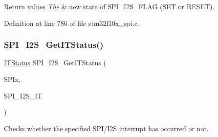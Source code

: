 \begin{DoxyRetVals}{Return values}
{\em The} & new state of S\+P\+I\+\_\+\+I2\+S\+\_\+\+F\+L\+AG (S\+ET or R\+E\+S\+ET). \\
\hline
\end{DoxyRetVals}


Definition at line 786 of file stm32f10x\+\_\+spi.\+c.

\mbox{\label{group___s_p_i___private___functions_ga72decbc1cd79f8fad92a2204beca6bc5}} 
\subsubsection{\texorpdfstring{S\+P\+I\+\_\+\+I2\+S\+\_\+\+Get\+I\+T\+Status()}{SPI\_I2S\_GetITStatus()}}
{\footnotesize\ttfamily \hyperlink{group___exported__types_gaacbd7ed539db0aacd973a0f6eca34074}{I\+T\+Status} S\+P\+I\+\_\+\+I2\+S\+\_\+\+Get\+I\+T\+Status (\begin{DoxyParamCaption}\item[{\hyperlink{struct_s_p_i___type_def}{S\+P\+I\+\_\+\+Type\+Def} $\ast$}]{S\+P\+Ix,  }\item[{uint8\+\_\+t}]{S\+P\+I\+\_\+\+I2\+S\+\_\+\+IT }\end{DoxyParamCaption})}



Checks whether the specified S\+P\+I/\+I2S interrupt has occurred or not. 


